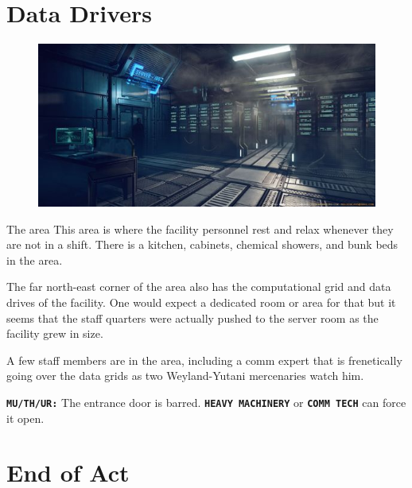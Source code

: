 \clearpage

\section{Data Drivers}


\begin{figure}
    \centering
    \includegraphics[width=.45\textwidth]{img/bg/server.jpg}
\end{figure}


\begin{rpg-commentbox}{The area}
    This area is where the facility personnel rest and relax whenever they are not in a shift. There is a kitchen, cabinets, chemical showers, and bunk beds in the area. 
    
    The far north-east corner of the area also has the computational grid and data drives of the facility. One would expect a dedicated room or area for that but it seems that the staff quarters were actually pushed to the server room as the facility grew in size. 

    A few staff members are in the area, including a comm expert that is frenetically going over the data grids as two Weyland-Yutani mercenaries watch him. 

    \texttt{\textbf{MU/TH/UR:}} The entrance door is barred. \texttt{\textbf{HEAVY MACHINERY}} or \texttt{\textbf{COMM TECH}} can force it open. 
\end{rpg-commentbox}  



\section{End of Act}



